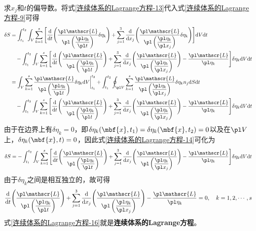 求$x_j$和$t$的偏导数。将式\eqref{连续体系的Lagrange方程-13}代入式\eqref{连续体系的Lagrange方程-9}可得
\begin{align}
	\delta S & = \int_{t_1}^{t_2} \int_V \sum_{k=1}^s \Bigg[\frac{\mathrm{d}}{\mathrm{d}t} \Bigg(\frac{\pl \mathscr{L}}{\pl \left(\dfrac{\pl \eta_k}{\pl t}\right)} \delta \eta_k\Bigg) + \sum_{j=1}^3 \frac{\mathrm{d}}{\mathrm{d}x_j} \Bigg(\frac{\pl \mathscr{L}}{\pl \left(\dfrac{\pl \eta_k}{\pl x_j}\right)} \delta \eta_k\Bigg)\Bigg] \mathrm{d}V\mathrm{d}t \nonumber \\
	& \quad {}- \int_{t_1}^{t_2} \int_V \sum_{k=1}^s \Bigg[\frac{\mathrm{d}}{\mathrm{d}t} \Bigg(\frac{\pl \mathscr{L}}{\pl \left(\dfrac{\pl \eta_k}{\pl t}\right)}\Bigg) + \sum_{j=1}^3 \frac{\mathrm{d}}{\mathrm{d}x_j} \Bigg(\frac{\pl \mathscr{L}}{\pl \left(\dfrac{\pl \eta_k}{\pl x_j}\right)}\Bigg) - \frac{\pl \mathscr{L}}{\pl \eta_k}\Bigg] \delta \eta_k \mathrm{d}V\mathrm{d}t \nonumber \\
	& = \int_V \sum_{k=1}^s \frac{\pl \mathscr{L}}{\pl \left(\dfrac{\pl \eta_k}{\pl t}\right)} \delta \eta_k \mathrm{d}V \bigg|_{t_1}^{t_2} + \int_{t_1}^{t_2} \oint_{\pl V} \sum_{k=1}^s \frac{\pl \mathscr{L}}{\pl \left(\dfrac{\pl \eta_k}{\pl x_j}\right)} \delta \eta_k n_j \mathrm{d}S \mathrm{d}t \nonumber \\
	& \quad {}- \int_{t_1}^{t_2} \int_V \sum_{k=1}^s \Bigg[\frac{\mathrm{d}}{\mathrm{d}t} \Bigg(\frac{\pl \mathscr{L}}{\pl \left(\dfrac{\pl \eta_k}{\pl t}\right)}\Bigg) + \sum_{j=1}^3 \frac{\mathrm{d}}{\mathrm{d}x_j} \Bigg(\frac{\pl \mathscr{L}}{\pl \left(\dfrac{\pl \eta_k}{\pl x_j}\right)}\Bigg) - \frac{\pl \mathscr{L}}{\pl \eta_k}\Bigg] \delta \eta_k \mathrm{d}V\mathrm{d}t
	\label{连续体系的Lagrange方程-14}
\end{align}
由于在边界上有$\delta \eta_k = 0$，即$\delta\eta_k(\mbf{x},t_1) = \delta\eta_k(\mbf{x},t_2) = 0$以及在$\pl V$上，$\delta \eta_k(\mbf{x},t) = 0$，因此式\eqref{连续体系的Lagrange方程-14}可化为
\begin{equation}
	\delta S = - \int_{t_1}^{t_2} \int_V \sum_{k=1}^s \Bigg[\frac{\mathrm{d}}{\mathrm{d}t} \Bigg(\frac{\pl \mathscr{L}}{\pl \left(\dfrac{\pl \eta_k}{\pl t}\right)}\Bigg) + \sum_{j=1}^3 \frac{\mathrm{d}}{\mathrm{d}x_j} \Bigg(\frac{\pl \mathscr{L}}{\pl \left(\dfrac{\pl \eta_k}{\pl x_j}\right)}\Bigg) - \frac{\pl \mathscr{L}}{\pl \eta_k}\Bigg] \delta \eta_k \mathrm{d}V\mathrm{d}t
	\label{连续体系的Lagrange方程-15}
\end{equation}
由于$\delta\eta_k$之间是相互独立的，故可得
\begin{equation}
	\frac{\mathrm{d}}{\mathrm{d}t} \Bigg(\frac{\pl \mathscr{L}}{\pl \left(\dfrac{\pl \eta_k}{\pl t}\right)}\Bigg) + \sum_{j=1}^3 \frac{\mathrm{d}}{\mathrm{d}x_j} \Bigg(\frac{\pl \mathscr{L}}{\pl \left(\dfrac{\pl \eta_k}{\pl x_j}\right)}\Bigg) - \frac{\pl \mathscr{L}}{\pl \eta_k} = 0,\quad k=1,2,\cdots,s
	\label{连续体系的Lagrange方程-16}
\end{equation}
式\eqref{连续体系的Lagrange方程-16}就是{\bf 连续体系的Lagrange方程}。

